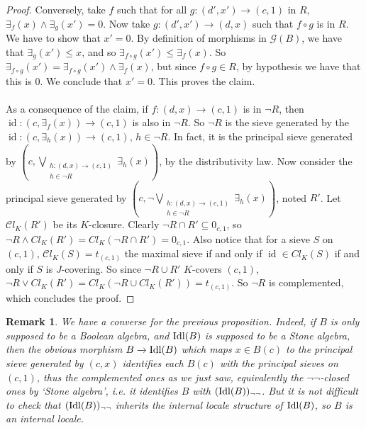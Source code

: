 \documentclass{article}
\newtheorem{remark}[theorem]{Remark}
\newcommand{\id}{\operatorname{id}}
\begin{document}
\begin{proof}
Conversely, take $f$ such that for all $g:(d',x')\xrightarrow{}(c,1)$ in $R$, $\exists_f(x)\land\exists_g(x')=0$. Now take $g:(d',x')\xrightarrow{}(d,x)$ such that $f\circ g$ is in $R$. We have to show that $x'=0$. By definition of morphisms in $\mathcal{G}(B)$, we have that $\exists_g(x')\leq x$, and so $\exists_{f\circ g}(x')\leq\exists_f(x)$. So $\exists_{f\circ g}(x')=\exists_{f\circ g}(x')\land \exists_f(x)$, but since $f\circ g\in R$, by hypothesis we have that this is $0$. We conclude that $x'=0$. This proves the claim.\\
\\
As a consequence of the claim, if $f:(d,x)\xrightarrow{}(c,1)$ is in $\neg R$, then $\id:(c,\exists_f(x))\xrightarrow{}(c,1)$ is also in $\neg R$. So $\neg R$ is the sieve generated by the $\id:(c,\exists_h(x))\xrightarrow{}(c,1)$, $h\in\neg R$. In fact, it is the principal sieve generated by $(c,\bigvee_{\substack{h:(d,x)\xrightarrow{}(c,1)\\h\in\neg R}}\exists_h(x))$, by the distributivity law. Now consider the principal sieve generated by $(c,\neg\bigvee_{\substack{h:(d,x)\xrightarrow{}(c,1)\\h\in\neg R}}\exists_h(x))$, noted $R'$. Let $\mathcal{C}l_K(R')$ be its $K$-closure. Clearly $\neg R\cap R'\subseteq 0_{c,1}$, so $\neg R\land Cl_K(R')=Cl_K(\neg R\cap R')= 0_{c,1}$. Also notice that for a sieve $S$ on $(c,1)$, $\mathcal{C}l_K(S)=t_{(c,1)}$ the maximal sieve if and only if $\id\in Cl_K(S)$ if and only if $S$ is $J$-covering. So since $\neg R\cup R'$ $K$-covers $(c,1)$, $\neg R \lor Cl_K(R')=Cl_K(\neg R\cup Cl_K(R'))=t_{(c,1)}$. So $\neg R$ is complemented, which concludes the proof. 
\end{proof}

\begin{remark}
    We have a converse for the previous proposition. Indeed, if $B$ is only supposed to be a Boolean algebra, and $\textup{Idl}(B)$ is supposed to be a Stone algebra, then the obvious morphism $B\xrightarrow{}\textup{Idl}(B)$ which maps $x\in B(c)$ to the principal sieve generated by $(c,x)$ identifies each $B(c)$ with the principal sieves on $(c,1)$, thus the complemented ones as we just saw, equivalently the $\neg\neg$-closed ones by `Stone algebra', i.e. it identifies $B$ with $(\textup{Idl}(B))_{\neg\neg}$. But it is not difficult to check that $(\textup{Idl}(B))_{\neg\neg}$ inherits the internal locale structure of $\textup{Idl}(B)$, so $B$ is an internal locale.
    \end{remark} 
\end{document}

